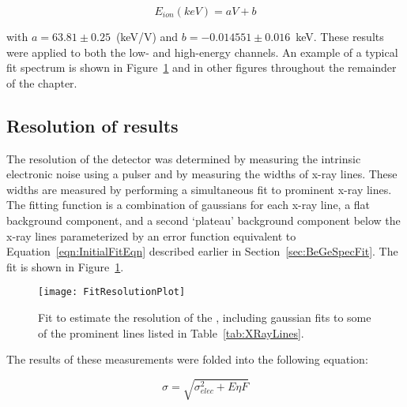			\[
			E_{ion} (keV) = a V + b
			\]  

with $a = 63.81\pm0.25$~(keV/V) and $b = -0.014551\pm0.016$~keV.  These results were applied to both the low- and high-energy channels.  An example of a typical fit spectrum is shown in Figure~\ref{fig:BeGeResFit} and in other figures throughout the remainder of the chapter.

		\subsection{Resolution of results}

The resolution of the detector was determined by measuring the intrinsic electronic noise using a pulser and by measuring the widths of x-ray lines.  These widths are measured by performing a simultaneous fit to prominent x-ray lines.  The fitting function is a combination of gaussians for each x-ray line, a flat background component, and a second `plateau' background component below the x-ray lines parameterized by an error function equivalent to Equation~\ref{eqn:InitialFitEqn} described earlier in Section~\ref{sec:BeGeSpecFit}.  The fit is shown in Figure~\ref{fig:BeGeResFit}.  
			\begin{figure}
				\centering
				\texttt{[image: FitResolutionPlot]}
				\caption[Estimate of \bege~resolution]
				{Fit to estimate the resolution of the \bege, including gaussian fits to some of the prominent lines listed in Table~\ref{tab:XRayLines}.}
				\label{fig:BeGeResFit}
			\end{figure}
The results of these measurements were folded into the following equation:

			\begin{equation}
				\sigma = \sqrt{\sigma_{elec}^{2} + E \eta F}
				\label{eqn:SigmaEqn}
			\end{equation}

